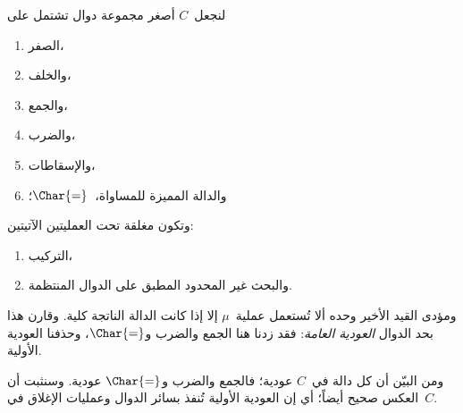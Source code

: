 \documentclass[../../../include/open-logic-section]{subfiles}
\begin{document}

لنجعل~$C$ أصغر مجموعة دوال تشتمل على
\begin{enumerate}
\item الصفر،
\item والخلف،
\item والجمع،
\item والضرب،
\item والإسقاطات،
\item والدالة المميزة للمساواة،~$\Char{=}$؛
\end{enumerate}
وتكون مغلقة تحت العمليتين الآتيتين:
\begin{enumerate}
\item التركيب،
\item والبحث غير المحدود المطبق على الدوال المنتظمة.
\end{enumerate}
ومؤدى القيد الأخير وحده ألا تُستعمل عملية~$\mu$ إلا إذا كانت الدالة
الناتجة كلية. وقارن هذا بحد الدوال \emph{العودية العامة}: فقد زدنا هنا
الجمع والضرب و$\Char{=}$، وحذفنا العودية الأولية.

ومن البيّن أن كل دالة في~$C$ عودية؛ فالجمع والضرب و$\Char{=}$ عودية.
وسنثبت أن العكس صحيح أيضاً؛ أي إن العودية الأولية تُنفذ بسائر الدوال
وعمليات الإغلاق في~$C$.
\end{document}
